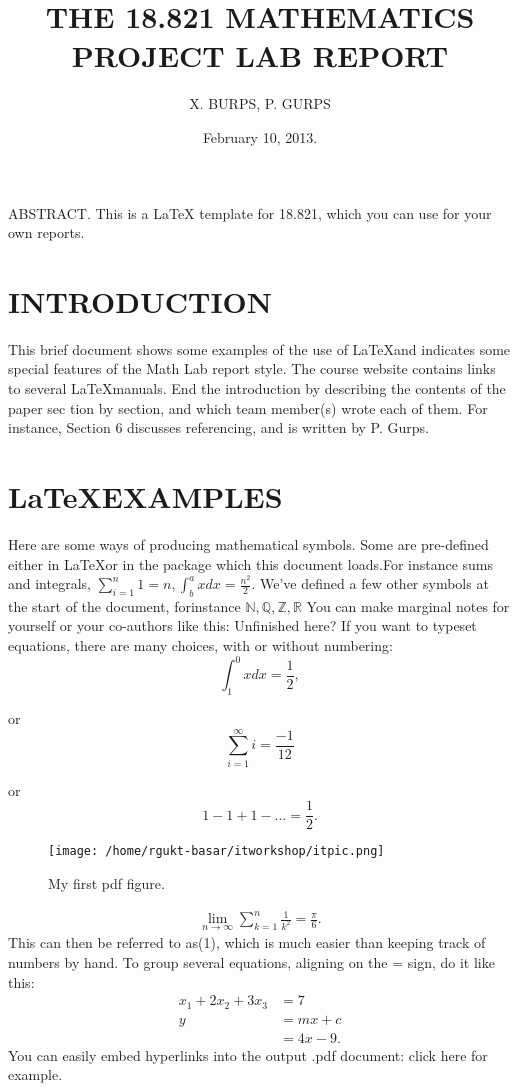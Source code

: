 \documentclass{article}
\title{\textbf{THE 18.821 MATHEMATICS PROJECT LAB REPORT
		\newline[REPLACE THIS WITH YOUR OWN SHORT DESCRIPTIVE TITLE!]}}
\author{X. BURPS, P. GURPS}
\date{}
\begin{document}
	\maketitle
	ABSTRACT. This is a \LaTeX{} template for 18.821, which you can use for your own reports.
	 \centering         \section{INTRODUCTION}
	This brief document shows some examples of the use of \LaTeX and
	indicates some special features of the Math Lab report style. The course website contains links to several \LaTeX manuals.
	End the introduction by describing the contents of the paper sec­
	tion by section, and which team member(s) wrote each of them. For
	instance, Section 6 discusses referencing, and is written by P. Gurps.
	\section{\LaTeX EXAMPLES}
	Here are some ways of producing mathematical symbols. Some are pre-deﬁned either in \LaTeX or in the
	package which this document loads.For instance sums and integrals, $ \sum_{i=1}^{n} 1=n ,\int^a_b xdx =\frac{n^2}{2}.$ We’ve deﬁned a few other symbols at the start of the document, forinstance $\mathbb{N,Q,Z,R}$ You can make marginal notes for yourself or your
	co-authors like this:	Unﬁnished here?
	If you want to typeset equations, there are many choices, with or
	without numbering:
\[	\int^0_1 xdx= \frac{1}{2}, \]
\raggedright 
or  
\[	\sum_{i=1}^{\infty}i=\frac{-1}{12} \]
\raggedright
or
\[  1-1+1-...=\frac{1}{2}.\]
\date{February 10, 2013.}
\newpage
{}
\begin{figure}[h]
\centering
\texttt{[image: /home/rgukt-basar/itworkshop/itpic.png]}
\caption{My ﬁrst pdf ﬁgure.}
\label{fig:pic}
\end{figure}
\begin{align}
	\lim_{n \to \infty} \sum_{k=1}^{n} \frac{1}{k^2}=\frac{\pi}{6}.
\end{align} 
This can then be referred to as(1), which is much easier than keeping
track of numbers by hand. To group several equations, aligning on the
= sign, do it like this:
\begin{align*}
	x_1 + 2x_2 + 3x_3 &= 7 \\
	y &= mx + c \\
	&= 4x - 9.
\end{align*}
You can easily embed hyperlinks into the output .pdf document:
click here for example.
\end{document}
